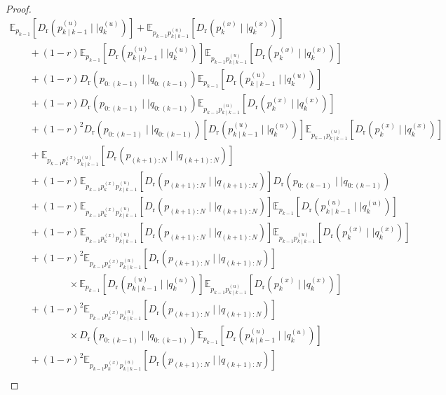 \documentclass[a4paper,fleqn]{cas-sc}
\newcommand{\E}{\mathbb{E}}
\newcommand{\Dr}[2]{{D}_{\text{r}}\left(#1\mid \mid #2 \right)}
\newcommand{\shortplant}[1]{p_{{#1}}^{(x)}}
\newcommand{\shortpolicy}[2]{p_{{#1}\mid{#2}}^{(u)}}
\begin{document}
\begin{proof}
\begin{equation}\label{eq:generalexpandk}
\begin{array}{l}
\E_{p_{k-1}}\left[\Dr{\shortpolicy{k}{k-1}}{q^{(u)}_k}\right] + \E_{p_{k-1}\shortpolicy{k}{k-1}}\left[\Dr{\shortplant{k}}{q^{(x)}_k}\right] \\ 
\qquad 
 + (1-r) \E_{p_{k-1}}\left[\Dr{\shortpolicy{k}{k-1}}{q^{(u)}_k}\right]\E_{p_{k-1}\shortpolicy{k}{k-1}}\left[\Dr{\shortplant{k}}{q^{(x)}_k}\right]
\\ 
\qquad
+ (1-r) \Dr{p_{0:(k-1)}}{q_{0:(k-1)}}\E_{p_{k-1}}\left[\Dr{\shortpolicy{k}{k-1}}{q^{(u)}_k}\right]
\\ 
\qquad
+ (1-r) \Dr{p_{0:(k-1)}}{q_{0:(k-1)}}\E_{p_{k-1}\shortpolicy{k}{k-1}}\left[\Dr{\shortplant{k}}{q^{(x)}_k}\right]
\\ 
\qquad
+ (1-r)^2 \Dr{p_{0:(k-1)}}{q_{0:(k-1)}}\left[\Dr{\shortpolicy{k}{k-1}}{q^{(u)}_k}\right]\E_{p_{k-1}\shortpolicy{k}{k-1}}\left[\Dr{\shortplant{k}}{q^{(x)}_k}\right]
\\ \qquad + \E_{p_{k-1}\shortplant{k}\shortpolicy{k}{k-1}}\left[\Dr{p_{(k+1):N}}{q_{(k+1):N}}\right] \\ 
\qquad + (1-r)  \E_{p_{k-1}\shortplant{k}\shortpolicy{k}{k-1}}\left[\Dr{p_{(k+1):N}}{q_{(k+1):N}}\right]  \Dr{p_{0:(k-1)}}{q_{0:(k-1)}}\\ 
\qquad + (1-r)  \E_{p_{k-1}\shortplant{k}\shortpolicy{k}{k-1}}\left[\Dr{p_{(k+1):N}}{q_{(k+1):N}}\right]
\E_{p_{k-1}}\left[\Dr{\shortpolicy{k}{k-1}}{q^{(u)}_k}\right]\\ 
\qquad + (1-r)  \E_{p_{k-1}\shortplant{k}\shortpolicy{k}{k-1}}\left[\Dr{p_{(k+1):N}}{q_{(k+1):N}}\right]
\E_{p_{k-1}\shortpolicy{k}{k-1}}\left[\Dr{\shortplant{k}}{q^{(x)}_k}\right] \\ 
\qquad + (1-r)^2  \E_{p_{k-1}\shortplant{k}\shortpolicy{k}{k-1}}\left[\Dr{p_{(k+1):N}}{q_{(k+1):N}}\right] \\ 
\qquad\qquad\qquad \times
\E_{p_{k-1}}\left[\Dr{\shortpolicy{k}{k-1}}{q^{(u)}_k}\right]\E_{p_{k-1}\shortpolicy{k}{k-1}}\left[\Dr{\shortplant{k}}{q^{(x)}_k}\right]
\\ \qquad + (1-r)^2  \E_{p_{k-1}\shortplant{k}\shortpolicy{k}{k-1}}\left[\Dr{p_{(k+1):N}}{q_{(k+1):N}}\right] \\ 
\qquad\qquad\qquad \times \Dr{p_{0:(k-1)}}{q_{0:(k-1)}}\E_{p_{k-1}}\left[\Dr{\shortpolicy{k}{k-1}}{q^{(u)}_k}\right]
\\ \qquad + (1-r)^2  \E_{p_{k-1}\shortplant{k}\shortpolicy{k}{k-1}}\left[\Dr{p_{(k+1):N}}{q_{(k+1):N}}\right] \\ 

\end{array}
\end{equation}
\end{proof}
\end{document}
